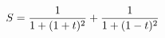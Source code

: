 \documentclass[preview]{standalone}
\begin{document}
\begin{align*}
\special{dvisvgm:raw <g id='unique000'>}S=\frac{1}{1+(1+t)^2}+\frac{1}{1+(1-t)^2}\special{dvisvgm:raw </g>}
\end{align*}
\end{document}
